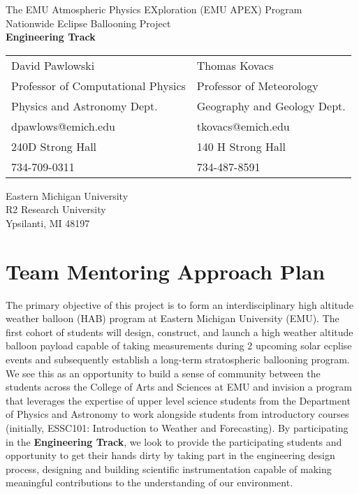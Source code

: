 \documentclass[12pt]{article}
\begin{document}
\Large
\begin{center}
The EMU Atmospheric Physics EXploration (EMU APEX) Program\\
\large
\vspace{2cm}
Nationwide Eclipse Ballooning Project\\
{\bf Engineering Track}
\vspace{1in}

\normalsize
\begin{table}[h]
\centering

  \begin{tabular}{ll}
  David Pawlowski&Thomas Kovacs\\
  Professor of Computational Physics&Professor of Meteorology\\
    Physics and Astronomy Dept.&Geography and Geology Dept.\\
  dpawlows@emich.edu&tkovacs@emich.edu\\
  240D Strong Hall&140 H Strong Hall\\
  734-709-0311&734-487-8591

  \end{tabular}
\end{table}


Eastern Michigan University\\
 R2 Research University\\
Ypsilanti, MI 48197
\end{center}

\small\normalsize
\newpage
\tableofcontents

\newpage
\section{Team Mentoring Approach Plan}
The primary objective of this project is to form an interdisciplinary
high altitude weather balloon (HAB) program at Eastern Michigan University (EMU).
The first cohort of students will design, construct, and launch a
high weather altitude balloon payload
capable of taking measurements during 2 upcoming solar ecplise events and subsequently
establish a long-term stratospheric ballooning program. We see this as an opportunity to build a sense of
community between the students across the College of Arts and Sciences at EMU and invision a program
that leverages the expertise of upper level science students from the Department of Physics and Astronomy
to work alongside students from introductory courses (initially, ESSC101:
Introduction to Weather and Forecasting). By participating in the {\bf Engineering Track}, we look to
provide the participating students and opportunity to get their hands dirty by taking part in the
engineering design process, designing and building scientific instrumentation capable of making
meaningful contributions to the understanding of our environment.
\end{document}
